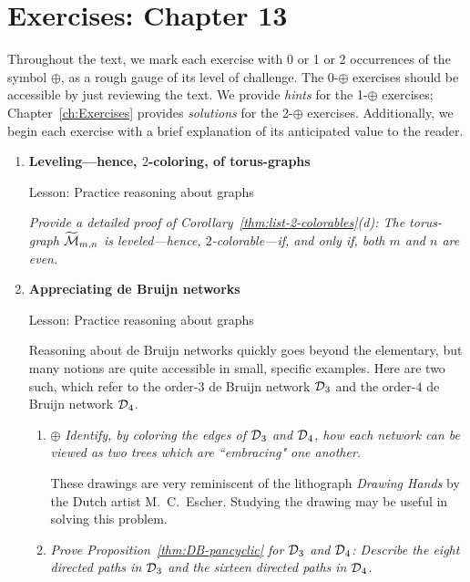 
\section{Exercises: Chapter 13}

Throughout the text, we mark each exercise with 0 or 1 or 2 occurrences of the symbol $\oplus$, as a rough gauge of its level of challenge.  The 0-$\oplus$ exercises should be accessible by just reviewing the text.  We provide {\em hints} for the 1-$\oplus$ exercises; Chapter~\ref{ch:Exercises} provides {\em solutions} for the 2-$\oplus$ exercises.  Additionally, we begin each exercise with a brief explanation of its anticipated value to the reader.
 

\begin{enumerate}
\item
{\bf Leveling---hence, $2$-coloring, of torus-graphs}

{\sc Lesson:} Practice reasoning about graphs

\smallskip

{\em Provide a detailed proof of Corollary~\ref{thm:list-2-colorables}(d):  The torus-graph $\widetilde{\mbox{$\cal M$}}_{m,n}$ is leveled---hence, $2$-colorable---if, and only if, both $m$ and $n$ are even.}

\medskip\item
{\bf Appreciating de Bruijn networks}

{\sc Lesson:} Practice reasoning about graphs

\smallskip

Reasoning about de Bruijn networks quickly goes beyond the elementary, but many notions are quite accessible in small, specific examples.  Here are two such, which refer to the order-$3$ de Bruijn network $\mbox{$\cal D$}_3$ and the order-$4$ de Bruijn network $\mbox{$\cal D$}_4$.

  \begin{enumerate}
  \item
$\oplus$
{\em Identify, by coloring the edges of $\mbox{$\cal D$}_3$ and $\mbox{$\cal D$}_4$, how each network can be viewed as two trees which are ``embracing" one another.}

\smallskip

These drawings are very reminiscent of the lithograph {\it Drawing Hands} by the Dutch artist M.~C.~Escher.  Studying the drawing may be useful in solving this problem.

  \medskip\item 
{\em Prove Proposition~\ref{thm:DB-pancyclic} for $\mbox{$\cal D$}_3$ and $\mbox{$\cal D$}_4$: Describe the eight directed paths in $\mbox{$\cal D$}_3$ and the sixteen directed paths in $\mbox{$\cal D$}_4$.}
  \end{enumerate}


\end{enumerate}
